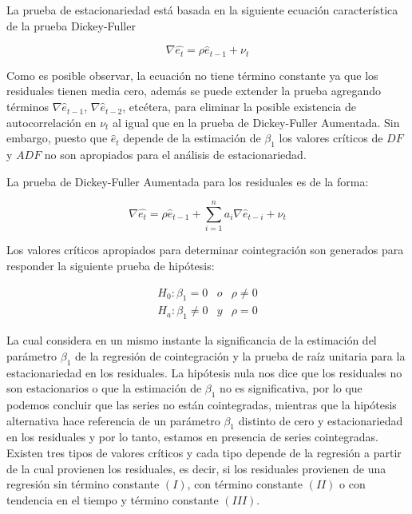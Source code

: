 La prueba de estacionariedad está basada en la siguiente ecuación característica de la prueba Dickey-Fuller

\begin{equation}
\nabla \hat{e_t} = \rho \hat{e}_{t-1} + \nu_t
\end{equation}

Como es posible observar, la ecuación no tiene término constante ya que los residuales tienen media cero, además se puede extender la prueba agregando términos $\nabla \hat{e}_{t-1}$, $\nabla \hat{e}_{t-2}$, etcétera, para eliminar la posible existencia de autocorrelación en $\nu_t$ al igual que en la prueba de Dickey-Fuller Aumentada. Sin embargo, puesto que $\hat{e}_t$ depende de la estimación de $\beta_1$ los valores críticos de $DF$ y $ADF$ no son apropiados para el análisis de estacionariedad. \bigskip

La prueba de Dickey-Fuller Aumentada para los residuales es de la forma:

\begin{equation}
\nabla \hat{e_t}= \rho \hat{e}_{t-1} + \sum_{i=1}^{n} a_{i} \nabla \hat{e}_{t-i}+\nu_t
\end{equation}

Los valores críticos apropiados para determinar cointegración son generados para responder la siguiente prueba de hipótesis:

   \begin{eqnarray}
    H_0: \beta_1= 0 & o  &  \rho \neq 0   \\ 
    H_a: \beta_1 \neq 0 & y & \rho=0 \nonumber
   \end{eqnarray} 
   
La cual considera en un mismo instante la significancia de la estimación del parámetro $\beta_1$ de la regresión de cointegración y la prueba de raíz unitaria para la estacionariedad en los residuales. La hipótesis nula nos dice que los residuales no son estacionarios o que la estimación de $\beta_1$ no es significativa, por lo que podemos concluir que las series no están cointegradas, mientras que la hipótesis alternativa hace referencia de un parámetro $\beta_1$ distinto de cero y estacionariedad en los residuales y por lo tanto, estamos en presencia de series cointegradas. Existen tres tipos de valores críticos y cada tipo depende de la regresión a partir de la cual provienen los residuales, es decir, si los residuales provienen de una regresión sin término constante $(I)$, con término constante $(II)$ o con tendencia en el tiempo y término constante $(III)$. 

